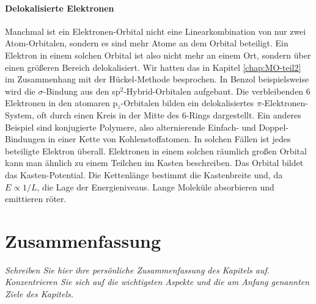 \paragraph{Delokalisierte Elektronen} Manchmal ist ein Elektronen-Orbital nicht eine Linearkombination von nur zwei Atom-Orbitalen, sondern es sind mehr Atome an dem Orbital beteiligt. Ein Elektron in einem solchen Orbital ist also nicht mehr an einem Ort, sondern über einen größeren Bereich delokalisiert. Wir hatten das in Kapitel  \ref{chap:MO-teil2} im Zusammenhang mit der Hückel-Methode besprochen. In Benzol beispielsweise wird die $\sigma$-Bindung aus den sp$^2$-Hybrid-Orbitalen aufgebaut. Die verbleibenden 6 Elektronen in den atomaren p$_z$-Orbitalen bilden ein delokalisiertes $\pi$-Elektronen-System, oft durch einen Kreis in der Mitte des 6-Rings dargestellt. Ein anderes Beispiel sind konjugierte Polymere, also alternierende Einfach- und Doppel-Bindungen in einer Kette von Kohlenstoffatomen. In solchen Fällen ist jedes beteiligte Elektron überall. Elektronen in einem solchen räumlich großen Orbital kann man ähnlich zu einem Teilchen im Kasten beschreiben. Das Orbital bildet das Kasten-Potential. Die Kettenlänge bestimmt die Kastenbreite und, da $E \propto 1 /L$, die Lage der Energieniveaus. Lange Moleküle absorbieren und emittieren röter.

\newpage
\section{Zusammenfassung}

\textit{Schreiben Sie hier ihre persönliche Zusammenfassung des Kapitels auf. Konzentrieren Sie sich auf die wichtigsten Aspekte und die am Anfang genannten Ziele des Kapitels.}

\vspace*{10cm}




\printbibliography[segment=\therefsegment,heading=subbibliography]
